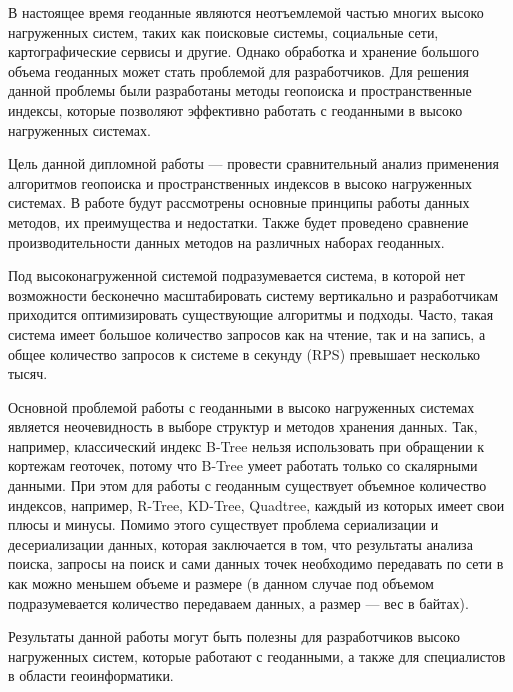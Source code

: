 \Introduction

В настоящее время геоданные являются неотъемлемой частью многих высоко нагруженных систем, таких как поисковые системы, социальные сети, картографические сервисы и другие. Однако обработка и хранение большого объема геоданных может стать проблемой для разработчиков. Для решения данной проблемы были разработаны методы геопоиска и пространственные индексы, которые позволяют эффективно работать с геоданными в высоко нагруженных системах.

Цель данной дипломной работы — провести сравнительный анализ применения алгоритмов геопоиска и пространственных индексов в высоко нагруженных системах. В работе будут рассмотрены основные принципы работы данных методов, их преимущества и недостатки. Также будет проведено сравнение производительности данных методов на различных наборах геоданных.

Под высоконагруженной системой подразумевается система, в которой нет возможности бесконечно масштабировать систему вертикально и разработчикам приходится оптимизировать существующие алгоритмы и подходы. Часто, такая система имеет большое количество запросов как на чтение, так и на запись, а общее количество запросов к системе в секунду (RPS) превышает несколько тысяч. 

Основной проблемой работы с геоданными в высоко нагруженных системах является неочевидность в выборе структур и методов хранения данных. Так, например, классический индекс B-Tree нельзя использовать при обращении к кортежам геоточек, потому что B-Tree умеет работать только со скалярными данными. При этом для работы с геоданным существует объемное количество индексов, например, R-Tree, KD-Tree, Quadtree, каждый из которых имеет свои плюсы и минусы. Помимо этого существует проблема сериализации и десериализации данных, которая заключается в том, что результаты анализа поиска, запросы на поиск и сами данных точек необходимо передавать по сети в как можно меньшем объеме и размере (в данном случае под объемом подразумевается количество передаваем данных, а размер — вес в байтах).

Результаты данной работы могут быть полезны для разработчиков высоко нагруженных систем, которые работают с геоданными, а также для специалистов в области геоинформатики.


